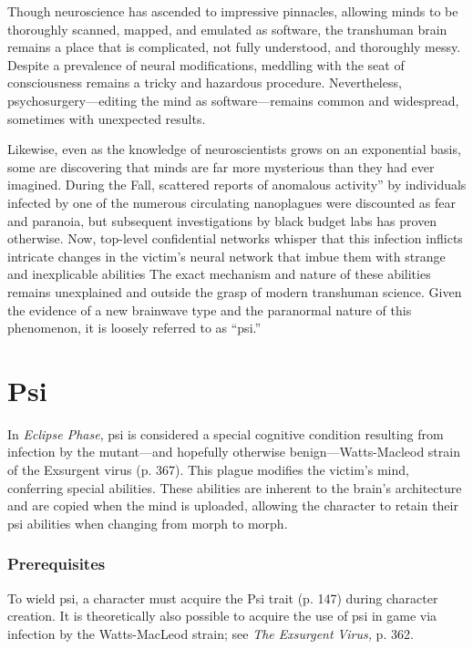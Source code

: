 Though neuroscience has ascended to impressive 
pinnacles, allowing minds to be thoroughly scanned, 
mapped, and emulated as software, the transhuman 
brain remains a place that is complicated, not fully 
understood, and thoroughly messy. Despite a prevalence
of neural modifications, meddling with the seat
of consciousness remains a tricky and hazardous 
procedure. Nevertheless, psychosurgery—editing the 
mind as software—remains common and widespread, 
sometimes with unexpected results.

Likewise, even as the knowledge of neuroscientists 
grows on an exponential basis, some are discovering 
that minds are far more mysterious than they had ever 
imagined. During the Fall, scattered reports of anomalous
activity'' by individuals infected by one of the
numerous circulating nanoplagues were discounted 
as fear and paranoia, but subsequent investigations 
by black budget labs has proven otherwise. Now, top-level
confidential networks whisper that this infection
inflicts intricate changes in the victim's neural network 
that imbue them with strange and inexplicable abilities
The exact mechanism and nature of these abilities
remains unexplained and outside the grasp of modern 
transhuman science. Given the evidence of a new 
brainwave type and the paranormal nature of this 
phenomenon, it is loosely referred to as ``psi.''

\section{Psi}

In \textit{Eclipse Phase}, psi is considered a special cognitive 
condition resulting from infection by the mutant—and 
hopefully otherwise benign—Watts-Macleod strain 
of the Exsurgent virus (p. 367). This plague modifies 
the victim's mind, conferring special abilities. These 
abilities are inherent to the brain's architecture and 
are copied when the mind is uploaded, allowing the 
character to retain their psi abilities when changing 
from morph to morph.

\subsubsection{Prerequisites}

To wield psi, a character must acquire the Psi trait (p. 
147) during character creation. It is theoretically also 
possible to acquire the use of psi in game via infection
by the Watts-MacLeod strain; see \textit{The Exsurgent }
\textit{Virus,} p. 362.

